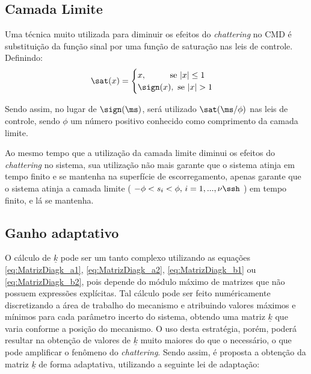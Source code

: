 \documentclass[]{politex}
\begin{document}
\begin{itemize}
\begin{itemize}
\end{itemize}



\end{itemize}

\subsection{Camada Limite}\label{S05-04-03-02}

Uma técnica muito utilizada para diminuir os efeitos do \emph{chattering} no CMD é substituição da função sinal por uma função de saturação nas leis de controle. Definindo:
\begin{equation}
\sat(x) = \begin{cases}
x, \;\;\;\;\;\;\;\;\; \text{ se } |x| \leq 1 \\
\sign(x), \text{ se } |x| > 1
\end{cases}
\end{equation}

Sendo assim, no lugar de $\sign(\ms)$, será utilizado $\sat(\ms / \phi)$ nas leis de controle, sendo $\phi$ um número positivo conhecido como comprimento da camada limite.

Ao mesmo tempo que a utilização da camada limite diminui os efeitos do \emph{chattering} no sistema, sua utilização não mais garante que o sistema atinja em tempo finito e se mantenha na superfície de escorregamento, apenas garante que o sistema atinja a camada limite ( $-\phi < s_i < \phi, \, i = 1,...,\nu\ssh $ ) em tempo finito, e lá se mantenha. 


\subsection{Ganho adaptativo}\label{S05-04-03-03}

O cálculo de $\underline{k}$ pode ser um tanto complexo utilizando as equações \eqref{eq:MatrizDiagk_a1}, \eqref{eq:MatrizDiagk_a2}, \eqref{eq:MatrizDiagk_b1} ou \eqref{eq:MatrizDiagk_b2}, pois depende do módulo máximo de matrizes que não possuem expressões explícitas. Tal cálculo pode ser feito numéricamente discretizando a área de trabalho do mecanismo e atribuindo valores máximos e mínimos para cada parâmetro incerto do sistema, obtendo uma matriz $\underline{k}$ que varia conforme a posição do mecanismo. O uso desta estratégia, porém, poderá resultar na obtenção de valores de $\underline{k}$ muito maiores do que o necessário, o que pode amplificar o fenômeno do \emph{chattering}. Sendo assim, é proposta a obtenção da matriz $\underline{k}$ de forma adaptativa, utilizando a seguinte lei de adaptação:
\end{document}
